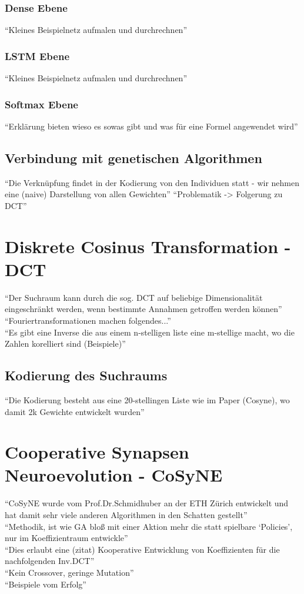             \subsubsection*{Dense Ebene}
                ``Kleines Beispielnetz aufmalen und durchrechnen''
            \subsubsection*{LSTM Ebene}
                ``Kleines Beispielnetz aufmalen und durchrechnen''
            \subsubsection*{Softmax Ebene}
                ``Erklärung bieten wieso es sowas gibt und was für eine Formel angewendet wird''
        \subsection{Verbindung mit genetischen Algorithmen}
            ``Die Verknüpfung findet in der Kodierung von den Individuen statt - wir nehmen eine (naive) Darstellung von allen Gewichten''
            ``Problematik -> Folgerung zu DCT''

    \section{Diskrete Cosinus Transformation - DCT}
        ``Der Suchraum kann durch die sog. DCT auf beliebige Dimensionalität eingeschränkt werden, wenn bestimmte Annahmen getroffen werden können'' \\
        ``Fouriertransformationen machen folgendes...'' \\
        ``Es gibt eine Inverse die aus einem n-stelligen liste eine m-stellige macht, wo die Zahlen korelliert sind (Beispiele)''
        \subsection{Kodierung des Suchraums}
            ``Die Kodierung besteht aus eine 20-stellingen Liste wie im Paper (Cosyne), wo damit 2k Gewichte entwickelt wurden''

    \section{Cooperative Synapsen Neuroevolution - CoSyNE}
        ``CoSyNE wurde vom Prof.Dr.Schmidhuber an der ETH Zürich entwickelt und hat damit sehr viele anderen Algorithmen in den Schatten gestellt''\\
        ``Methodik, ist wie GA bloß mit einer Aktion mehr die statt spielbare `Policies', nur im Koeffizientraum entwickle'' \\
        ``Dies erlaubt eine (zitat) Kooperative Entwicklung von Koeffizienten für die nachfolgenden Inv.DCT'' \\
        ``Kein Crossover, geringe Mutation'' \\
        ``Beispiele vom Erfolg'' \\
